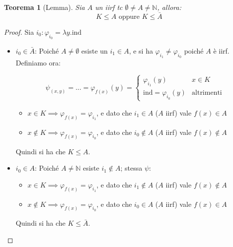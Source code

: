 \documentclass[a4paper,10pt,oneside]{article}
\theoremstyle{break}
\newtheorem{teo}{Teorema}[subsection]
\newcommand{\naturals}{\mathbb {N}}
\begin{document}
\begin{mdframed}
 \begin{teo}[Lemma]
  Sia $A$ un iirf tc $\emptyset \neq A \neq \naturals$, allora: \[K \leq A \text{ oppure }K \leq \bar A\]
 \end{teo}
 \begin{proof}
  Sia $i_0 : \varphi_{i_0} = \lambda y. \text{ind}$
  
  \begin{itemize}
   \item $i_0 \in \bar A$: Poiché $A \neq \emptyset$ esiste un $i_1 \in A$, e si ha $\varphi_{i_1} \neq \varphi_{i_0} $ poiché $A$ è iirf. Definiamo ora:
   
   \[ \psi_(x, y) = ... = \varphi_{f(x)}(y) = \begin{cases}
                                               \varphi_{i_1} (y) & x \in K\\
                                               \text{ind} = \varphi_{i_0}(y) & \text{altrimenti}
                                              \end{cases}
 \]
 
  \begin{itemize}
   \item $x \in K \implies \varphi_{f(x)} = \varphi_{i_1}$, e dato che $i_1 \in A$ ($A$ iirf) vale $f(x) \in A$
  
   \item $x \notin K \implies \varphi_{f(x)} = \varphi_{i_0}$, e dato che $i_0 \notin A$ ($A$ iirf) vale $f(x) \not\in A$  
  \end{itemize}
Quindi si ha che $K \leq A$.
  \item $i_0 \in A$: Poiché $A \neq \naturals$ esiste $i_1 \notin A$; stessa $\psi$: 
  \begin{itemize}
   \item $x \in K \implies \varphi_{f(x)} = \varphi_{i_1}$, e dato che $i_1 \notin A$ ($A$ iirf) vale $f(x) \notin A$
   \item $x \notin K \implies \varphi_{f(x)} = \varphi_{i_0}$, e dato che $i_0 \in A$ ($A$ iirf) vale $f(x) \in A$
   \end{itemize}
Quindi si ha che $K \leq \bar A$.
  \end{itemize}
 \end{proof}

\end{mdframed}
\end{document}
